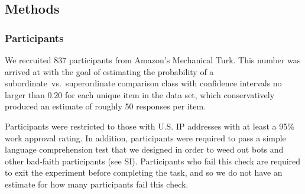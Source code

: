 \documentclass[doc, floatsintext]{apa6}
\newcommand{\red}[1]{\textcolor{Red}{#1}}
\begin{document}









\subsection{Methods}

\subsubsection{Participants}

We recruited 837 participants from Amazon's Mechanical Turk.
This number was arrived at with the goal of estimating the probability of a subordinate~vs.~superordinate comparison class with confidence intervals no larger than 0.20 for each unique item in the data set, which conservatively produced an estimate of roughly 50 responses per item.

Participants were restricted to those with U.S. IP addresses with at least a 95\% work approval rating.
In addition, participants were required to pass a simple language comprehension test that we designed in order to weed out bots and other bad-faith participants (see SI).
Participants who fail this check are required to exit the experiment before completing the task, and so we do not have an estimate for how many participants fail this check.

\end{document}
